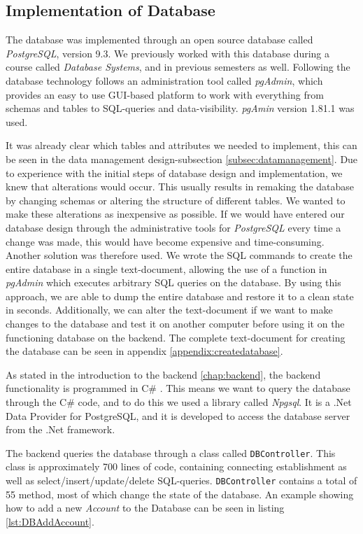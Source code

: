 \subsection{Implementation of Database}
\label{subsec:dbImpl}
The database was implemented through an open source database called \textit{PostgreSQL}\cite{postgreSQL}, version 9.3. We previously worked with this database during a course called \textit{Database Systems}, and in previous semesters as well. Following the database technology follows an administration tool called \textit{pgAdmin}\cite{pgAdmin}, which provides an easy to use GUI-based platform to work with everything from schemas and tables to SQL-queries and data-visibility. \textit{pgAmin} version 1.81.1 was used.

It was already clear which tables and attributes we needed to implement, this can be seen in the data management design-subsection \ref{subsec:datamanagement}. Due to experience with the initial steps of database design and implementation, we knew that alterations would occur. This usually results in remaking the database by changing schemas or altering the structure of different tables. We wanted to make these alterations as inexpensive as possible. If we would have entered our database design through the administrative tools for \textit{PostgreSQL} every time a change was made, this would have become expensive and time-consuming. Another solution was therefore used. We wrote the SQL commands to create the entire database in a single text-document, allowing the use of a function in \textit{pgAdmin} which executes arbitrary SQL queries on the database. By using this approach, we are able to dump the entire database and restore it to a clean state in seconds. Additionally, we can alter the text-document if we want to make changes to the database and test it on another computer before using it on the functioning database on the backend. The complete text-document for creating the database can be seen in appendix \ref{appendix:createdatabase}. 

As stated in the introduction to the backend \ref{chap:backend}, the backend functionality is programmed in C\# . This means we want to query the database through the C\# code, and to do this we used a library called \textit{Npgsql}\cite{npgsql}. It is a .Net Data Provider for PostgreSQL, and it is developed to access the database server from the .Net framework\cite{npgsql}. 

The backend queries the database through a class called \texttt{DBController}. This class is approximately 700 lines of code, containing connecting establishment as well as select/insert/update/delete SQL-queries. \texttt{DBController} contains a total of 55 method, most of which change the state of the database. An example showing how to add a new \textit{Account} to the Database can be seen in listing \ref{lst:DBAddAccount}.

